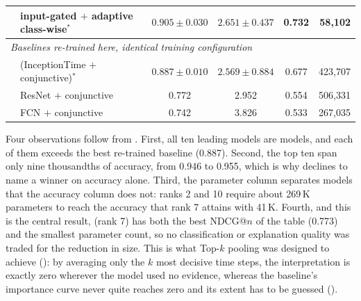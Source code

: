 \begin{table}[tbp]
\begin{center}
\begin{tabular}{rlcccr}
   & \seanet{} input-gated $+$ adaptive class-wise$^\ast$ & $0.905\pm0.030$ & $2.651\pm0.437$ & 0.732 & 58{,}102 \\
\midrule
\multicolumn{6}{l}{\emph{Baselines re-trained here, identical training configuration}}\\
   & \millet{} (InceptionTime $+$ conjunctive)$^\ast$ & $0.887\pm0.010$ & $2.569\pm0.884$ & 0.677 & 423{,}707 \\
   & ResNet $+$ conjunctive                           & 0.772 & 2.952 & 0.554 & 506{,}331 \\
   & FCN $+$ conjunctive                              & 0.742 & 3.826 & 0.533 & 267{,}035 \\
\bottomrule
\end{tabular}
\end{center}
\end{table}

Four observations follow from . First, all ten leading models are \seanet{}
models, and each of them exceeds the best re-trained baseline (0.887). Second, the top ten span only
nine thousandths of accuracy, from 0.946 to 0.955, which is why  declines to
name a winner on accuracy alone. Third, the parameter column separates models that the accuracy
column does not: ranks 2 and 10 require about 269\,K parameters to reach the accuracy that rank 7
attains with 41\,K. Fourth, and this is the central result, \mbot{} (rank 7) has both the best
NDCG@$n$ of the table (0.773) and the smallest parameter count, so no classification or explanation
quality was traded for the reduction in size. This is what Top-$k$ pooling was designed to achieve
(): by averaging only the $k$ most decisive time steps, the interpretation is
exactly zero wherever the model used no evidence, whereas the baseline's importance curve never
quite reaches zero and its extent has to be guessed ().

